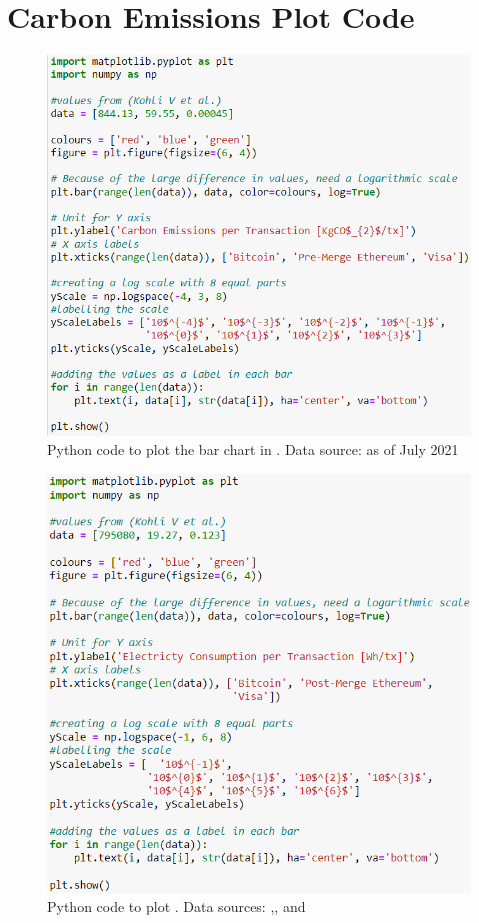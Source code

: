 \chapter{Carbon Emissions Plot Code}

\begin{figure}[h]
    \centering
    \includegraphics[width=13cm,center]{Figures/CarbonEmissionsPlotCode.png}
    \caption{Python code to plot the bar chart in . Data source: \cite{Kohli2023AnSolutions} as of July 2021}
    \label{Figure:CarbonEmissionsPlotCode}
\end{figure}


\begin{figure}[h]
    \centering
    \includegraphics[width=13cm,center]{Figures/ElectrictyConsumptionPlotCode.png}
    \caption{Python code to plot . Data sources: \cite{VisaHome},\cite{2022VisaReport},\cite{BitcoinDigiconomist}  and  }
    \label{Figure:ElectrictyConsumptionPlotCode}
\end{figure}

